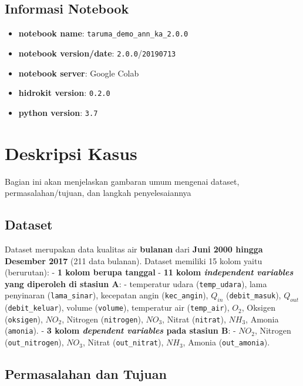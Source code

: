 \documentclass[11pt]{article}
\providecommand{\tightlist}{%
      \setlength{\itemsep}{0pt}\setlength{\parskip}{0pt}}
\begin{document}
\hypertarget{informasi-notebook}{%
\subsection{Informasi Notebook}\label{informasi-notebook}}

\begin{itemize}
\tightlist
\item
  \textbf{notebook name}: \texttt{taruma\_demo\_ann\_ka\_2.0.0}
\item
  \textbf{notebook version/date}: \texttt{2.0.0}/\texttt{20190713}
\item
  \textbf{notebook server}: Google Colab
\item
  \textbf{hidrokit version}: \texttt{0.2.0}
\item
  \textbf{python version}: \texttt{3.7}
\end{itemize}

    \hypertarget{deskripsi-kasus}{%
\section{Deskripsi Kasus}\label{deskripsi-kasus}}

Bagian ini akan menjelaskan gambaran umum mengenai dataset,
permasalahan/tujuan, dan langkah penyelesaiannya

    \hypertarget{dataset}{%
\subsection{Dataset}\label{dataset}}

Dataset merupakan data kualitas air \textbf{bulanan} dari \textbf{Juni
2000 hingga Desember 2017} (211 data bulanan). Dataset memiliki 15 kolom
yaitu (berurutan): - \textbf{1 kolom berupa tanggal} - \textbf{11 kolom
\emph{independent variables} yang diperoleh di stasiun A}: - temperatur
udara (\texttt{temp\_udara}), lama penyinaran (\texttt{lama\_sinar}),
kecepatan angin (\texttt{kec\_angin}), \(Q_{in}\)
(\texttt{debit\_masuk}), \(Q_{out}\) (\texttt{debit\_keluar}), volume
(\texttt{volume}), temperatur air (\texttt{temp\_air}), \(O_2\), Oksigen
(\texttt{oksigen}), \(NO_2\), Nitrogen (\texttt{nitrogen}), \(NO_3\),
Nitrat (\texttt{nitrat}), \(NH_3\), Amonia (\texttt{amonia}). -
\textbf{3 kolom \emph{dependent variables} pada stasiun B}: - \(NO_2\),
Nitrogen (\texttt{out\_nitrogen}), \(NO_3\), Nitrat
(\texttt{out\_nitrat}), \(NH_3\), Amonia (\texttt{out\_amonia}).

    \hypertarget{permasalahan-dan-tujuan}{%
\subsection{Permasalahan dan Tujuan}\label{permasalahan-dan-tujuan}}
\end{document}
